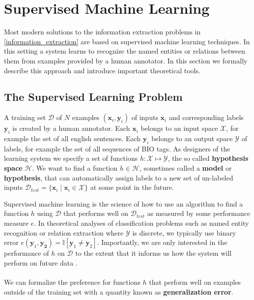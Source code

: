 \section{Supervised Machine Learning}
\label{supervised_machine_learning}

Most modern solutions to the information extraction problems in \ref{information_extraction} are based on supervised machine learning techniques. In this setting a system learns to recognize the named entities or relations between them from examples provided by a human annotator. In this section we formally describe this approach and introduce important theoretical tools.

\subsection{The Supervised Learning Problem}
\label{the_supervised_learning_problem}
A training set $\mathcal{D}$ of $N$ examples $(\mathbf{x}_i, \mathbf{y}_i)$ of inputs $\mathbf{x}_i$ and corresponding labels $\mathbf{y}_i$ is created by a human annotator. Each $\mathbf{x}_i$ belongs to an input space $\mathcal{X}$, for example the set of all english sentences. Each $\mathbf{y}_i$ belongs to an output space $\mathcal{Y}$ of labels, for example the set of all sequences of BIO tags. As designers of the learning system we specify a set of functions $h: \mathcal{X} \mapsto \mathcal{Y}$, the so called \textbf{hypothesis space} $\mathcal{H}$. We want to find a function $h \in \mathcal{H}$, sometimes called a \textbf{model} or \textbf{hypothesis}, that can automatically assign labels to a new set of un-labeled inputs $\mathcal{D}_{test} = \{ \mathbf{x}_i \mid \mathbf{x}_i \in \mathcal{X}\}$ at some point in the future. 

Supervised machine learning is the science of how to use an algorithm to find a function $h$ using $\mathcal{D}$ that performs well on $\mathcal{D}_{test}$ as measured by some performance measure $e$. In theoretical analyses of classification problems such as named entity recognition or relation extraction where $\mathcal{Y}$ is discrete, we typically use binary error $e(\mathbf{y}_1, \mathbf{y_2}) = \mathbb{I}[\mathbf{y}_1 \neq \mathbf{y}_2]$. Importantly, we are only interested in the performance of $h$ on $\mathcal{D}$ to the extent that it informs us how the system will perform on future data \citep{yaser12}.
\\\\
We can formalize the preference for functions $h$ that perform well on examples outside of the training set with a quantity known as \textbf{generalization error}.

